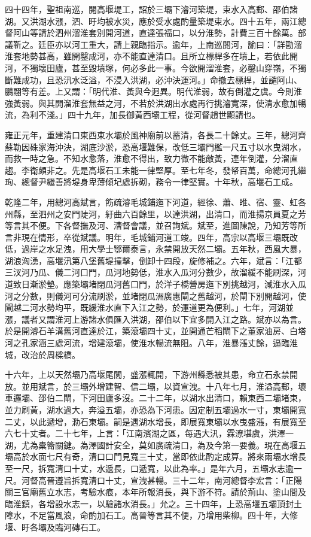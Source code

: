 \begin{pinyinscope}
四十四年，聖祖南巡，閱高堰堤工，詔於三壩下濬河築堤，束水入高郵、邵伯諸湖。又洪湖水漲，泗、盱均被水災，應於受水處酌量築堤束水。四十五年，兩江總督阿山等請於泗州溜淮套別開河道，直達張福口，以分淮勢，計費三百十餘萬。部議靳之。廷臣亦以河工重大，請上親臨指示。逾年，上南巡閱河，諭曰：「詳勘溜淮套地勢甚高，雖開鑿成河，亦不能直達清口。且所立標桿多在墳上，若依此開河，不獨壞田廬，甚至毀墳塚，何必多此一事。今欲開溜淮套，必鑿山穿嶺，不獨斷難成功，且恐汛水泛溢，不浸入洪湖，必沖決運河。」命撤去標桿，並譴阿山、鵬翮等有差。上又謂：「明代淮、黃與今迥異。明代淮弱，故有倒灌之虞。今則淮強黃弱。與其開溜淮套無益之河，不若於洪湖出水處再行挑濬寬深，使清水愈加暢流，為利不淺。」四十九年，加長御黃西壩工程，從河督趙世顯請也。

雍正元年，重建清口東西束水壩於風神廟前以蓄清，各長二十餘丈。三年，總河齊蘇勒因硃家海沖決，湖底沙淤，恐高堰難保，改低三壩門檻一尺五寸以水曳湖水，而救一時之急。不知水愈落，淮愈不得出，致力微不能敵黃，連年倒灌，分溜直趨。李衛頗非之。先是高堰石工未能一律堅厚。至七年冬，發帑百萬，命總河孔繼珣、總督尹繼善將堤身卑薄傾圮處拆砌，務令一律堅實。十年秋，高堰石工成。

乾隆二年，用總河高斌言，飭疏濬毛城鋪迤下河道，經徐、蕭、睢、宿、靈、虹各州縣，至泗州之安門陡河，紆曲六百餘里，以達洪湖，出清口，而淮揚京員夏之芳等言其不便。下各督撫及河、漕督會議，並召詢斌。斌至，進圖陳說，乃知芳等所言非現在情形，卒從斌議。明年，毛城鋪河道工竣。四年，高宗以高堰三壩既改低，過岸之水足洩，用大學士鄂爾泰言，永禁開放天然二壩。五年秋，西風大暴，湖浪洶湧，高堰汛第八堡舊堤撞擊，倒卸十四段，旋修補之。六年，斌言：「江都三汊河乃瓜、儀二河口門，瓜河地勢低，淮水入瓜河分數少，故溜緩不能刷深，河道致日漸淤墊。應築壩堵閉瓜河舊口門，於洋子橋營房迤下別挑越河，減淮水入瓜河之分數，則儀河可分流刷淤，並堵閉瓜洲廣惠閘之舊越河，於閘下別開越河，使閘越二河水勢均平，既緩淮水直下入江之勢，於運道更為便利。」七年，河湖並漲，議者又謂淮河上游諸水俱匯入洪湖，邵伯以下宜多開入江之路。斌亦以為言。於是開濬石羊溝舊河直達於江，築滾壩四十丈，並開通芒稻閘下之董家油房、白塔河之孔家涵三處河流，增建滾壩，使淮水暢流無阻。八年，淮暴漲丈餘，逼臨淮城，改治於周樑橋。

十六年，上以天然壩乃高堰尾閭，盛漲輒開，下游州縣悉被其患，命立石永禁開放。並用斌言，於三壩外增建智、信二壩，以資宣洩。十八年七月，淮溢高郵，壞車邏壩、邵伯二閘，下河田廬多沒。二十二年，以湖水出清口，賴東西二壩堵束，並力刷黃，湖水過大，奔溢五壩，亦恐為下河患。因定制五壩過水一寸，東壩開寬二丈，以此遞增，泐石東壩。嗣是遇湖水增長，即展寬東壩以水曳盛漲，有展寬至六七十丈者。二十七年，上言：「江南濱湖之區，每遇大汛，霖潦堪虞，洪澤一湖，尤為橐籥關鍵。為澤國計安全，莫如廣疏清口，為及今第一要義。現在高堰五壩高於水面七尺有奇，清口口門見寬三十丈，當即依此酌定成算。將來兩壩水增長至一尺，拆寬清口十丈，水遞長，口遞寬，以此為率。」是年六月，五壩水志逾一尺。河督高晉遵旨拆寬清口十丈，宣洩甚暢。三十二年，南河總督李宏言：「正陽關三官廟舊立水志，考驗水痕，本年所報消長，與下游不符。請於荊山、塗山間及臨淮鎮，各增設水志一，以驗諸水消長。」允之。三十四年，上恐高堰五壩頂封土障水，不足當風浪，命酌加石工。高晉等言其不便，乃增用柴柳。四十年，大修堰、盱各壩及臨河磚石工。


\end{pinyinscope}
